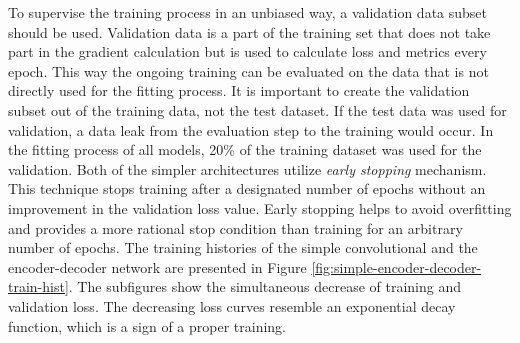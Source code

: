 To supervise the training process in an unbiased way, a validation data subset should be used.
Validation data is a part of the training set that does not take part in the gradient calculation but is used to calculate loss and metrics every epoch.
This way the ongoing training can be evaluated on the data that is not directly used for the fitting process.
It is important to create the validation subset out of the training data, not the test dataset.
If the test data was used for validation, a data leak from the evaluation step to the training would occur.
In the fitting process of all models, 20\% of the training dataset was used for the validation.
Both of the simpler architectures utilize \textit{early stopping} mechanism.
This technique stops training after a designated number of epochs without an improvement in the validation loss value.
Early stopping helps to avoid overfitting and provides a more rational stop condition than training for an arbitrary number of epochs.
The training histories of the simple convolutional and the encoder-decoder network are presented in Figure \ref{fig:simple-encoder-decoder-train-hist}.
The subfigures show the simultaneous decrease of training and validation loss.
The decreasing loss curves resemble an exponential decay function, which is a sign of a proper training.
